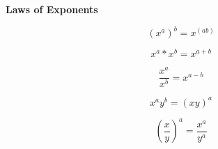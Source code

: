 \documentclass{article}
\begin{document}
\textbf{Laws of Exponents}

\begin{equation}
\left( {x^a } \right)^b = x^{\left( {ab} \right)}
\end{equation}

\begin{equation}
x^{a} * x^{b} = x^{a+b}
\end{equation}

\begin{equation}
\frac{x^{a}}{  x^{b}} = x^{a-b}
\end{equation}

\begin{equation}
x^{a}  y^{b} = \left(xy\right)^{a}
\end{equation}

\begin{equation}
\left( {\frac{x}{y}} \right)^a =  \frac{x^a}{y^a}
\end{equation}
\end{document}

